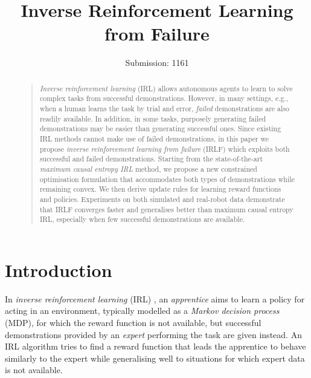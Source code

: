 \documentclass[letterpaper]{article}
\begin{document}
%
\title{Inverse Reinforcement Learning from Failure}
\author{Submission: 1161}
\maketitle
\begin{abstract}
\begin{quote}

\emph{Inverse reinforcement learning} (IRL) allows autonomous agents to learn to solve complex tasks from successful demonstrations.  However, in many settings, e.g., when a human learns the task by trial and error, \emph{failed} demonstrations are also readily available.  In addition, in some tasks, purposely generating failed demonstrations may be easier than generating successful ones.  Since existing IRL methods cannot make use of failed demonstrations, in this paper we propose \emph{inverse reinforcement learning from failure} (IRLF) which exploits both successful and failed demonstrations.  Starting from the state-of-the-art \emph{maximum causal entropy IRL} method, we propose a new constrained optimisation formulation that accommodates both types of demonstrations while remaining convex.  We then derive update rules for learning reward functions and policies. Experiments on both simulated and real-robot data demonstrate that IRLF converges faster and generalises better than maximum causal entropy IRL, especially when few successful demonstrations are available.

\end{quote}
\end{abstract}

\section{Introduction}

In \emph{inverse reinforcement learning} (IRL) \cite{ng2000algorithms}, an \emph{apprentice} aims to learn a policy for acting in an environment, typically modelled as a \emph{Markov decision process} (MDP), for which the reward function is not available, but successful demonstrations provided by an \emph{expert} performing the task are given instead. An IRL algorithm tries to find a reward function that leads the apprentice to behave  similarly to the expert while generalising well to situations for which expert data is not available. 
\end{document}
